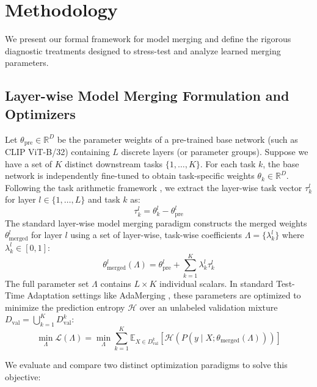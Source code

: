 \section{Methodology}
\label{sec:methodology}

We present our formal framework for model merging and define the rigorous diagnostic treatments designed to stress-test and analyze learned merging parameters.

\subsection{Layer-wise Model Merging Formulation and Optimizers}
Let $\theta_{\text{pre}} \in \mathbb{R}^D$ be the parameter weights of a pre-trained base network (such as CLIP ViT-B/32) containing $L$ discrete layers (or parameter groups). Suppose we have a set of $K$ distinct downstream tasks $\{1, \dots, K\}$. For each task $k$, the base network is independently fine-tuned to obtain task-specific weights $\theta_k \in \mathbb{R}^D$. Following the task arithmetic framework \cite{ilharco2022editing}, we extract the layer-wise task vector $\tau^l_k$ for layer $l \in \{1, \dots, L\}$ and task $k$ as:
\begin{equation}
    \tau^l_k = \theta^l_k - \theta^l_{\text{pre}}
\end{equation}
The standard layer-wise model merging paradigm constructs the merged weights $\theta^l_{\text{merged}}$ for layer $l$ using a set of layer-wise, task-wise coefficients $\Lambda = \{\lambda^l_k\}$ where $\lambda^l_k \in [0, 1]$:
\begin{equation}
    \theta^l_{\text{merged}}(\Lambda) = \theta^l_{\text{pre}} + \sum_{k=1}^K \lambda^l_k \tau^l_k
\end{equation}
The full parameter set $\Lambda$ contains $L \times K$ individual scalars. In standard Test-Time Adaptation settings like AdaMerging \cite{yang2024adamerging}, these parameters are optimized to minimize the prediction entropy $\mathcal{H}$ over an unlabeled validation mixture $D_{\text{val}} = \bigcup_{k=1}^K D^k_{\text{val}}$:
\begin{equation}
    \label{eq:opt_obj}
    \min_{\Lambda} \mathcal{L}(\Lambda) = \min_{\Lambda} \sum_{k=1}^K \mathbb{E}_{X \in D^k_{\text{val}}} [ \mathcal{H}( P( y \mid X; \theta_{\text{merged}}(\Lambda) ) ) ]
\end{equation}

We evaluate and compare two distinct optimization paradigms to solve this objective:

